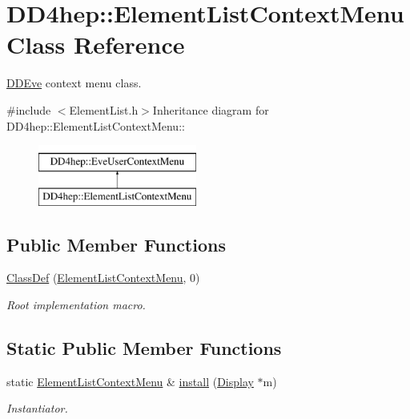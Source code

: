 \hypertarget{class_d_d4hep_1_1_element_list_context_menu}{
\section{DD4hep::ElementListContextMenu Class Reference}
\label{class_d_d4hep_1_1_element_list_context_menu}
}


\hyperlink{struct_d_d4hep_1_1_d_d_eve}{DDEve} context menu class.  


{\ttfamily \#include $<$ElementList.h$>$}Inheritance diagram for DD4hep::ElementListContextMenu::\begin{figure}[H]
\begin{center}
\leavevmode
\includegraphics[height=2cm]{class_d_d4hep_1_1_element_list_context_menu}
\end{center}
\end{figure}
\subsection*{Public Member Functions}
\begin{DoxyCompactItemize}
\item 
\hyperlink{class_d_d4hep_1_1_element_list_context_menu_ab60b3abac1f709147788e8de09e8aebb}{ClassDef} (\hyperlink{class_d_d4hep_1_1_element_list_context_menu}{ElementListContextMenu}, 0)
\begin{DoxyCompactList}\small\item\em Root implementation macro. \item\end{DoxyCompactList}\end{DoxyCompactItemize}
\subsection*{Static Public Member Functions}
\begin{DoxyCompactItemize}
\item 
static \hyperlink{class_d_d4hep_1_1_element_list_context_menu}{ElementListContextMenu} \& \hyperlink{class_d_d4hep_1_1_element_list_context_menu_aa7cb9b95de9a2e5ff1b4a152de62cd79}{install} (\hyperlink{class_d_d4hep_1_1_display}{Display} $\ast$m)
\begin{DoxyCompactList}\small\item\em Instantiator. \item\end{DoxyCompactList}\end{DoxyCompactItemize}

